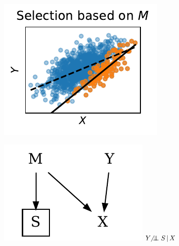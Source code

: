 \documentclass[twocolumn]{article}
\newcommand\indep{\protect\mathpalette{\protect\independenT}{\perp}}
\def\independenT#1#2{\mathrel{\rlap{$#1#2$}\mkern3.5mu{#1#2}}}
\newcommand\nindep{\protect\centernot\indep}
\begin{document}
\begin{figure}
\begin{minipage}{.3\textwidth}
\begin{minipage}{\textwidth}
    \begin{minipage}{\textwidth}
  \begin{minipage}{.57\textwidth}
\vspace{-7pt}
    \includegraphics[width=\textwidth]{selection_bias_2.pdf}
  \end{minipage}%
  \begin{minipage}{.42\textwidth}
    \includegraphics[width=\textwidth]{sample_selection_bias_2.pdf}
    \centering
    \(Y \nindep S \, | \, X\)
  \end{minipage}
  \end{minipage}


\end{minipage}
\end{minipage}
\end{figure}
\end{document}
